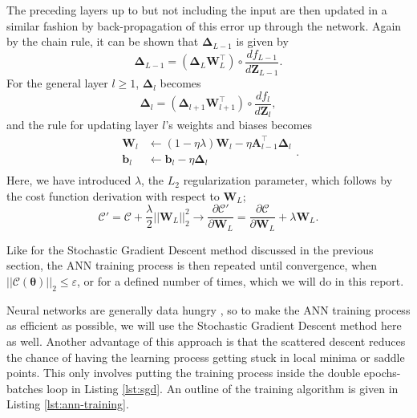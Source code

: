\documentclass[]{article}
\begin{document}
The preceding layers up to but not including the input are then updated in a similar fashion by back-propagation of this error up through the network. Again by the chain rule, it can be shown that $\mathbf{\Delta}_{L-1}$ is given by
\begin{equation}
	\mathbf{\Delta}_{L-1} = (\mathbf{\Delta}_L \mathbf{W}_L^\intercal) \circ \frac{df_{L-1}}{d\mathbf{Z}_{L-1}}.
\end{equation}
For the general layer $l \ge 1$, $\mathbf{\Delta}_l$ becomes
\begin{equation} \label{update-deltas}
	\mathbf{\Delta}_{l} = (\mathbf{\Delta}_{l+1} \mathbf{W}_{l+1}^\intercal) \circ \frac{df_l}{d\mathbf{Z}_l},
\end{equation}
and the rule for updating layer $l$'s weights and biases becomes
\begin{equation} \label{update-weights-biases}
\begin{aligned}
	\mathbf{W}_l &\leftarrow (1 - \eta \lambda) \mathbf{W}_l - \eta \mathbf{A}_{l-1}^\intercal \mathbf{\Delta}_l \\
	\mathbf{b}_l &\leftarrow \mathbf{b}_l - \eta \mathbf{\Delta}_l \\
\end{aligned}.
\end{equation}
Here, we have introduced $\lambda$, the $L_2$ regularization parameter, which follows by the cost function derivation with respect to $\mathbf{W}_L$;
\begin{equation}
	\mathcal{C}' = \mathcal{C} + \frac{\lambda}{2} ||\mathbf{W}_L||_2^2 \rightarrow \frac{\partial \mathcal{C}'}{\partial \mathbf{W}_L} = \frac{\partial \mathcal{C}}{\partial \mathbf{W}_L} + \lambda \mathbf{W}_L.
\end{equation}

\vspace{5mm}

Like for the Stochastic Gradient Descent method discussed in the previous section, the ANN training process is then repeated until convergence, when $||\mathcal{C}(\mathbf{\theta})||_2 \le \varepsilon$, or for a defined number of times, which we will do in this report.

\vspace{5mm}

Neural networks are generally data hungry \cite{fys-stk4155-notes}, so to make the ANN training process as efficient as possible, we will use the Stochastic Gradient Descent method here as well. Another advantage of this approach is that the scattered descent reduces the chance of having the learning process getting stuck in local minima or saddle points. This only involves putting the training process inside the double epochs-batches loop in Listing \ref{lst:sgd}. An outline of the training algorithm is given in Listing \ref{lst:ann-training}.
\end{document}
